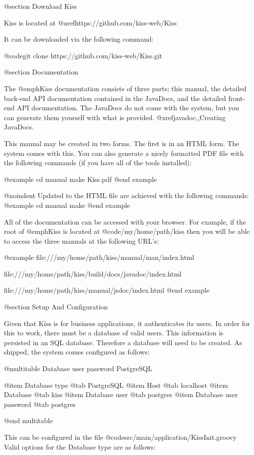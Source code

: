 @section Download Kiss


Kiss is located at @uref{https://github.com/kiss-web/Kiss}

It can be downloaded via the following command:

@code{git clone https://github.com/kiss-web/Kiss.git}

@section Documentation

The @emph{Kiss} documentation consists of three parts; this manual, the detailed back-end API documentation contained in the JavaDocs,
and the detailed front-end API documentation.
The JavaDocs do not come with the system, but you can generate them yourself with what is provided.  @xref{javadoc,,Creating JavaDocs}.

This manual may be created in two forms.  The first is in an HTML
form.  The system comes with this.  You can also generate a nicely
formatted PDF file with the following commands (if you have all of the tools installed):

@example
cd manual
make Kiss.pdf
@end example

@noindent
Updated to the HTML file are achieved with the following commands:
@example
cd manual
make
@end example

All of the documentation can be accessed with your browser.  For example,
if the root of @emph{Kiss} is located at @code{/my/home/path/kiss} then you will be able to access the three
manuals at the following URL's:

@example
file:///my/home/path/kiss/manual/man/index.html

file:///my/home/path/kiss/build/docs/javadoc/index.html

file:///my/home/path/kiss/manual/jsdoc/index.html
@end example

@section Setup And Configuration

Given that Kiss is for business applications, it authenticates its
users.  In order for this to work, there must be a database of valid
users.  This information is persisted in an SQL database.  Therefore a
database will need to be created.  As shipped, the system comes
configured as follows:

@multitable {Database user password} {PostgreSQL} 

@item Database type
@tab PostgreSQL
@item Host
@tab localhost
@item Database
@tab kiss
@item Database user
@tab postgres
@item Database user password
@tab postgres

@end multitable

This can be configured in the file @code{src/main/application/KissInit.groovy}
Valid options for the Database type are as follows:

